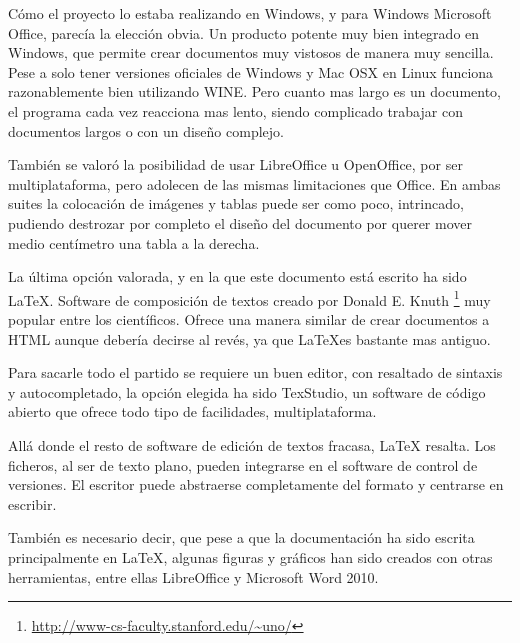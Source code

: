 C\'{o}mo el proyecto lo estaba realizando en Windows, y para Windows Microsoft Office, parec\'{i}a la elecci\'{o}n obvia. Un 
producto potente muy bien integrado
en Windows, que permite crear documentos muy vistosos de manera muy sencilla. 
Pese a solo tener versiones oficiales de Windows y Mac OSX en Linux
funciona razonablemente bien utilizando WINE. Pero cuanto mas largo es un documento, el programa cada vez reacciona
mas lento, siendo complicado trabajar con documentos largos o con un dise\~no complejo.

Tambi\'en se valor\'o la posibilidad de usar LibreOffice u OpenOffice, por ser multiplataforma, pero adolecen
de las mismas limitaciones que Office. En ambas suites la colocaci\'on de im\'agenes y tablas puede ser como poco,
intrincado, pudiendo destrozar por completo el dise\~no del documento por querer mover medio cent\'imetro una tabla a la
derecha.

La \'ultima opci\'on valorada, y en la que este documento est\'a escrito ha sido \LaTeX.
Software de composici\'{o}n de textos creado por Donald E. Knuth \footnote{\url{http://www-cs-faculty.stanford.edu/~uno/}} 
muy popular entre los cient\'{i}ficos. Ofrece una manera similar de crear documentos a HTML 
aunque deber\'{i}a decirse al rev\'{e}s, ya que \LaTeX es bastante mas antiguo.

Para sacarle todo el partido se requiere un buen editor, con resaltado de sintaxis y autocompletado, 
la opci\'on elegida ha sido TexStudio, un
software de c\'{o}digo abierto que ofrece todo tipo de facilidades, multiplataforma.

All\'a donde el resto de software de edici\'on de textos fracasa, LaTeX resalta. Los ficheros, al ser de texto plano,
pueden integrarse en el software de control de versiones. El escritor puede abstraerse completamente del formato
y centrarse en escribir.

Tambi\'en es necesario decir, que pese a que la documentaci\'on ha sido escrita principalmente en LaTeX, algunas figuras
y gr\'aficos han sido creados con otras herramientas, entre ellas LibreOffice y Microsoft Word 2010.
